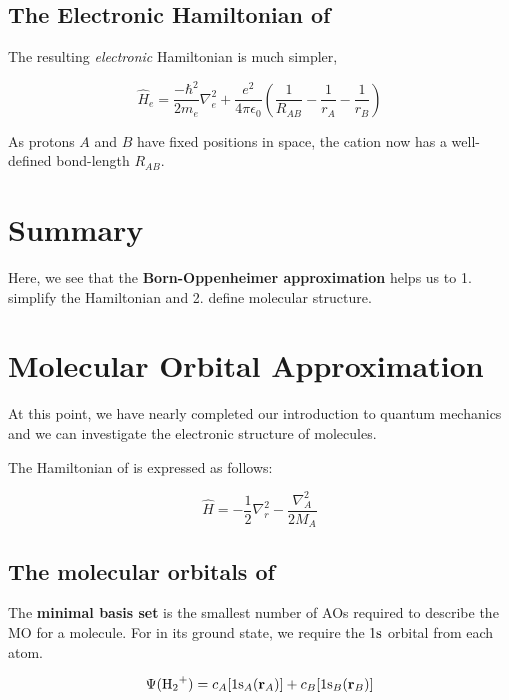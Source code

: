 \documentclass[a4paper]{tufte-handout}
\theoremstyle{definition}
\begin{document}
\subsection{The Electronic Hamiltonian of }

The resulting \textit{electronic} Hamiltonian is much simpler,

\begin{equation}
  \hat{H}_e = \frac{-\hbar^2}{2m_e}\nabla^2_e + \frac{e^2}{4\pi\epsilon_0} \left( \frac{1}{R_{AB}} - \frac{1}{r_{A}} - \frac{1}{r_{B}} \right)
\end{equation}

As protons $A$ and $B$ have fixed positions in space, the  cation now has a well-defined bond-length $R_{AB}$.

\section{Summary}

Here, we see that the \textbf{Born-Oppenheimer approximation} helps us to 1. simplify the Hamiltonian and 2. define molecular structure.


\section{Molecular Orbital Approximation}

At this point, we have nearly completed our introduction to quantum mechanics 
and we can investigate the electronic structure of molecules.

The Hamiltonian of  is expressed as follows:

\begin{equation}
  \hat{H} = -\frac{1}{2}\nabla^2_r - \frac{\nabla^2_A}{2M_A}
\end{equation}

\subsection{The molecular orbitals of }

The \textbf{minimal basis set} is the smallest number of AOs required to describe the MO for a molecule. For 
in its ground state, we require the $1\ce{s}$ orbital from each  atom.

\begin{equation}
  \Psi(\ce{H2+}) = c_A [1\ce{s_}_A (\mathbf{r}_A)]+ c_B [1\ce{s_}_B (\mathbf{r}_B)]
\end{equation}
\end{document}
